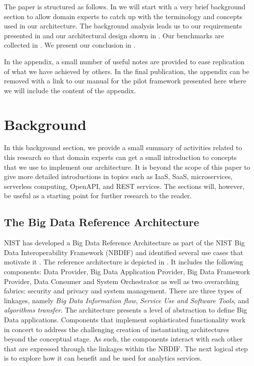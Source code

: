 The paper is structured as follows. In  we will start with a very brief background section to allow domain experts to catch up with the terminology and concepts used in our architecture. The background analysis leads us to our requirements presented in  and our architectural design shown in . Our benchmarks are collected in . We present our conclusion in .

In the appendix, a small number of useful notes are provided to ease replication of what we have achieved by others. In the final publication, the appendix can be removed with a link to our manual for the pilot framework presented here \cite{cloudmesh-manual, cloudmesh-openapi} where we will include the content of the appendix. 

\section{Background}
\label{sec:background}

In this background section, we provide a small summary of activities related to this research so that domain experts can get a small introduction to concepts that we use to implement our architecture. It is beyond the scope of this paper to give more detailed introductions in topics such as IaaS, SaaS, microservices, serverless computing, OpenAPI, and REST services. The sections will, however, be useful as a starting point for further research to the reader. 

\subsection{The Big Data Reference Architecture}

NIST has developed a Big Data Reference Architecture as part of the NIST Big Data Interoperability Framework (NBDIF)\cite{nist-v6} and identified several use cases that motivate
it \cite{nist-v3}. The reference architecture is depicted in . It includes the following components: Data Provider, Big Data Application Provider, Big Data Framework Provider, Data Consumer and
System Orchestrator as well as two overarching fabrics: security and
privacy and system management. There are three types of linkages,
namely \emph{Big Data Information flow}, \emph{Service Use and
  Software Tools}, and \emph{algorithms transfer}. The architecture
presents a level of abstraction to define Big Data
applications. Components that implement sophisticated functionality
work in concert to address the challenging creation of instantiating architectures beyond the conceptual stage. As such, the components
interact with each other that are expressed through the linkages
within the NBDIF.  The next logical step is to explore how it can
benefit and be used for analytics services.

